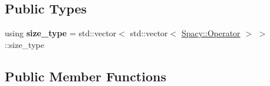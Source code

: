 \subsection*{Public Types}
\begin{DoxyCompactItemize}
\item 
\hypertarget{classSpacy_1_1ProductSpace_1_1Operator_a60e9bfb3fdb49717df0d88d1bf9e5a77}{using {\bfseries size\-\_\-type} = std\-::vector$<$ std\-::vector$<$ \hyperlink{classSpacy_1_1Operator}{Spacy\-::\-Operator} $>$ $>$\-::size\-\_\-type}\label{classSpacy_1_1ProductSpace_1_1Operator_a60e9bfb3fdb49717df0d88d1bf9e5a77}

\end{DoxyCompactItemize}
\subsection*{Public Member Functions}
